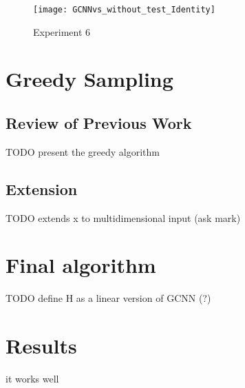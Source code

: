 \documentclass{article}
\begin{document}
\begin{figure}[h]
\centering
\texttt{[image: GCNNvs\_without\_test\_Identity]}
\caption{
Experiment 6
}
\label{without_test_balanced_Iden}
\end{figure}



\section*{Greedy Sampling}
\subsection*{Review of Previous Work}

TODO present the greedy algorithm

\subsection*{Extension}
TODO extends x to multidimensional input (ask mark)
\section*{Final algorithm}
TODO define H as a linear version of GCNN (?)
\section*{Results}
it works well
{}
\end{document}
